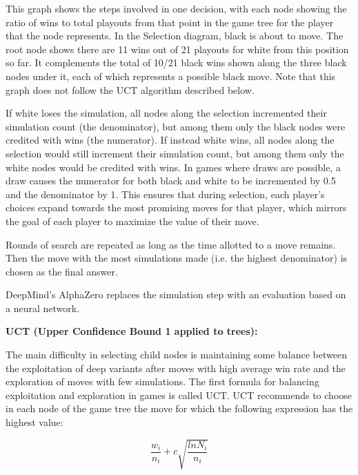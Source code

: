 \documentclass{article}
\begin{document}
\noindent This graph shows the steps involved in one decision, with each node showing the ratio of wins to total playouts from that point in the game tree for the player that the node represents. In the Selection diagram, black is about to move. The root node shows there are 11 wins out of 21 playouts for white from this position so far. It complements the total of 10/21 black wins shown along the three black nodes under it, each of which represents a possible black move. Note that this graph does not follow the UCT algorithm described below.

\bigskip

\noindent If white loses the simulation, all nodes along the selection incremented their simulation count (the denominator), but among them only the black nodes were credited with wins (the numerator). If instead white wins, all nodes along the selection would still increment their simulation count, but among them only the white nodes would be credited with wins. In games where draws are possible, a draw causes the numerator for both black and white to be incremented by 0.5 and the denominator by 1. This ensures that during selection, each player's choices expand towards the most promising moves for that player, which mirrors the goal of each player to maximize the value of their move.

\bigskip

\noindent Rounds of search are repeated as long as the time allotted to a move remains. Then the move with the most simulations made (i.e. the highest denominator) is chosen as the final answer.

\bigskip

\noindent DeepMind's AlphaZero replaces the simulation step with an evaluation based on a neural network.

\bigskip

\noindent \textbf{UCT (Upper Confidence Bound 1 applied to trees):}

\bigskip

\noindent The main difficulty in selecting child nodes is maintaining some balance between the exploitation of deep variants after moves with high average win rate and the exploration of moves with few simulations. The first formula for balancing exploitation and exploration in games is called UCT. UCT recommends to choose in each node of the game tree the move for which the following expression has the highest value:

\[\frac{w_{i}}{n_{i}} + c \sqrt{\frac{ln N_{i}}{n_i}}\]
\end{document}
